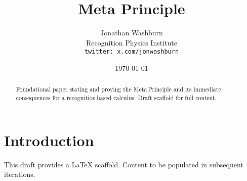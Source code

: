 \documentclass[11pt,letterpaper]{article}
\title{Meta Principle}
\author{Jonathan Washburn\\Recognition Physics Institute\\\texttt{twitter: x.com/jonwashburn}}
\date{\today}
\begin{document}
\maketitle
\begin{abstract}
Foundational paper stating and proving the Meta\,Principle and its immediate consequences for a recognition\,based calculus. Draft scaffold for full content.
\end{abstract}
\section{Introduction}
This draft provides a LaTeX scaffold. Content to be populated in subsequent iterations.
\end{document}
